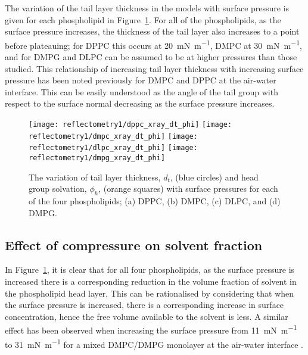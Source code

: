 The variation of the tail layer thickness in the models with surface pressure is given for each phospholipid in Figure~\ref{fig:dtphi}.
For all of the phospholipids, as the surface pressure increases, the thickness of the tail layer also increases to a point before plateauing; for DPPC this occurs at \SI{20}{\milli\newton\per\meter}, DMPC at \SI{30}{\milli\newton\per\meter}, and for DMPG and DLPC can be assumed to be at higher pressures than those studied.
This relationship of increasing tail layer thickness with increasing surface pressure has been noted previously for DMPC \cite{bayerl_specular_1990} and DPPC \cite{campbell_structure_2018} at the air-water interface.
This can be easily understood as the angle of the tail group with respect to the surface normal decreasing as the surface pressure increases.
%
\begin{figure}
    \centering
    \texttt{[image: reflectometry1/dppc\_xray\_dt\_phi]}
    \texttt{[image: reflectometry1/dmpc\_xray\_dt\_phi]}
    \texttt{[image: reflectometry1/dlpc\_xray\_dt\_phi]}
    \texttt{[image: reflectometry1/dmpg\_xray\_dt\_phi]}
    \caption{The variation of tail layer thickness, $d_t$, (blue circles) and head group solvation, $\phi_h$, (orange squares) with surface pressures for each of the four phospholipids; (a) DPPC, (b) DMPC, (c) DLPC, and (d) DMPG.}
    \label{fig:dtphi}
\end{figure}
%

\subsection{Effect of compressure on solvent fraction}
In Figure~\ref{fig:dtphi}, it is clear that for all four phospholipids, as the surface pressure is increased there is a corresponding reduction in the volume fraction of solvent in the phospholipid head layer,
This can be rationalised by considering that when the surface pressure is increased, there is a corresponding increase in surface concentration, hence the free volume available to the solvent is less.
A similar effect has been observed when increasing the surface pressure from \SI{11}{\milli\newton\per\meter} to \SI{31}{\milli\newton\per\meter} for a mixed DMPC/DMPG monolayer at the air-water interface \cite{bayerl_specular_1990}.

